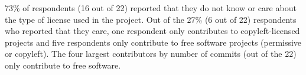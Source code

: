 
73\% of respondents (16 out of 22) reported that they do not know or care about the type of license used in the project. Out of the 27\% (6 out of 22) respondents who reported that they care, one respondent only contributes to copyleft-licensed projects and five respondents only contribute to free software projects (permissive or copyleft). The four largest contributors by number of commits (out of the 22) only contribute to free software.
